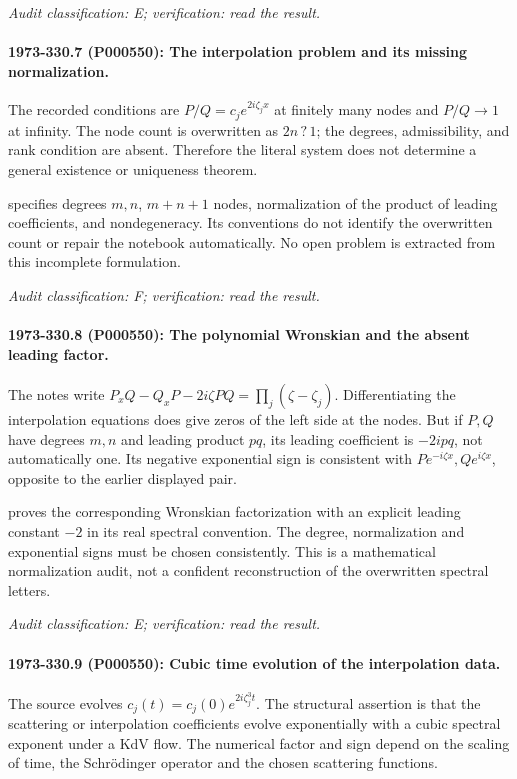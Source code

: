 \emph{Audit classification: E; verification: read the result.}

\paragraph{1973-330.7 (P000550): The interpolation problem and its missing normalization.}
The recorded conditions are \(P/Q=c_j e^{2i\zeta_jx}\) at finitely many nodes and \(P/Q\to1\) at infinity. The node count is overwritten as \(2n\,?\,1\); the degrees, admissibility, and rank condition are absent. Therefore the literal system does not determine a general existence or uniqueness theorem.

\citet[\S3, equations (44)--(49), Theorem~1]{shabat2014interpolation} specifies degrees \(m,n\), \(m+n+1\) nodes, normalization of the product of leading coefficients, and nondegeneracy. Its conventions do not identify the overwritten count or repair the notebook automatically. No open problem is extracted from this incomplete formulation.

\emph{Audit classification: F; verification: read the result.}

\paragraph{1973-330.8 (P000550): The polynomial Wronskian and the absent leading factor.}
The notes write \(P_xQ-Q_xP-2i\zeta PQ=\prod_j(\zeta-\zeta_j)\). Differentiating the interpolation equations does give zeros of the left side at the nodes. But if \(P,Q\) have degrees \(m,n\) and leading product \(pq\), its leading coefficient is \(-2ipq\), not automatically one. Its negative exponential sign is consistent with \(Pe^{-i\zeta x},Qe^{i\zeta x}\), opposite to the earlier displayed pair.

\citet[Theorem~1, equation (50)]{shabat2014interpolation} proves the corresponding Wronskian factorization with an explicit leading constant \(-2\) in its real spectral convention. The degree, normalization and exponential signs must be chosen consistently. This is a mathematical normalization audit, not a confident reconstruction of the overwritten spectral letters.

\emph{Audit classification: E; verification: read the result.}

\paragraph{1973-330.9 (P000550): Cubic time evolution of the interpolation data.}
The source evolves \(c_j(t)=c_j(0)e^{2i\zeta_j^3t}\). The structural assertion is that the scattering or interpolation coefficients evolve exponentially with a cubic spectral exponent under a KdV flow. The numerical factor and sign depend on the scaling of time, the Schrödinger operator and the chosen scattering functions.

